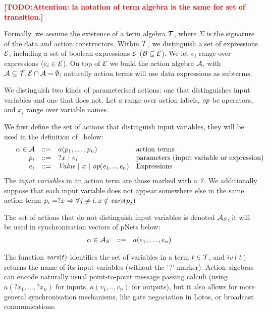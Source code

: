 \documentclass{lncs/llncs}
\newcommand{\TODO}[1]{\textcolor{red}{\textbf{[TODO:#1]}}}
\begin{document}
\TODO{Attention: la notation of term algebra is the same for set of transition.}

Formally, we assume the existence of a term algebra $\mathcal{T}$,
where $\Sigma$ is the signature of the data and action constructors. Within $\mathcal{T}$, we distinguish a set of
 expressions $\mathcal{E}$, including a set of boolean
expressions $\mathcal{E}$ ($\mathcal{B}\subseteq\mathcal{E}$). We let $e_i$ range over expressions ($e_i\in\mathcal{E}$).
On top of $\mathcal{E}$ we build the action algebra
$\mathcal{A}$, with $\mathcal{A}\subseteq\mathcal{T},
\mathcal{E}\cap\mathcal{A}=\emptyset$;
naturally action terms will use data expressions as subterms.

We distinguish two kinds of parameterised actions: one that distinguishes input variables and one that does not. Let $a$
range over action labels, $\symb{op}$ be operators, and $x_i$ range over
variable names.

We first define the set of actions that distinguish input variables, they will be used in the definition of \pLTS\ below:
\[
\begin{array}[l]{rcl@{\quad}p{5.5cm}}
  \alpha\in\AlgA&::=&a(p_1,\ldots,p_n)&\text{action terms}\\
  p_i&::=& ?x~|~e_i&\text{parameters (input variable or expression)}\\
  e_i&::=& \symb{Value}~|~x~|~\symb{op}(\symb{e}_1,..,\symb{e}_n)&\text{Expressions}
\end{array}
\]
The \emph{input variables} in an action term are those marked with a
$\symb{?}$.
We additionally suppose that each input variable does not
appear somewhere else in the same action term:
$p_i=?x\Rightarrow\forall j\neq i.\, x\notin \vars(p_j)$

The set of actions that do not distinguish input variables is denoted $\mathcal{A}_S$, it will be used in synchronisation vectors of pNets below:
\[\begin{array}[l]{rcl@{\quad}l}
  \alpha\in \AlgAS &::=&a(e_1,\ldots,e_n)
\end{array}
\]

The function
$\vars(t)$ identifies the set of variables in a term
$t\in\mathcal{T}$, and $iv(t)$ returns the name of its input variables (without the '?' marker).
Action algebras can encode naturally usual point-to-point message passing calculi (using 
$a(?x_1,...,?x_n)$ for inputs, $a(v_1,..,v_n)$ for outputs), but it also allows
for more general synchronisation mechanisms, like gate negociation in Lotos, or broadcast
communications. 
\end{document}
